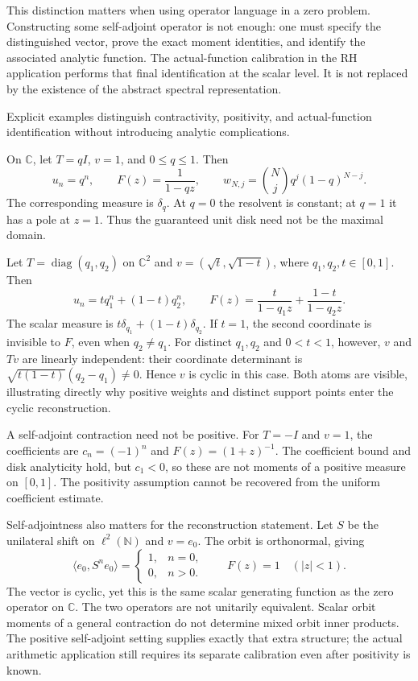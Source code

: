 This distinction matters when using operator language in a zero
problem. Constructing some self-adjoint operator is not enough:
one must specify the distinguished vector, prove the exact
moment identities, and identify the associated analytic function.
The actual-function calibration in the RH application performs
that final identification at the scalar level. It is not
replaced by the existence of the abstract spectral representation.

\label{hilb:examples}
Explicit examples distinguish contractivity, positivity, and
actual-function identification without introducing analytic
complications.

\begin{example}
On $\mathbb C$, let $T=qI$, $v=1$, and $0\le q\le1$. Then
\[
 u_n=q^n,\qquad F(z)=\frac1{1-qz},\qquad
 w_{N,j}=\binom Nj q^j(1-q)^{N-j}.
\]
The corresponding measure is $\delta_q$. At $q=0$ the
resolvent is constant; at $q=1$ it has a pole at $z=1$.
Thus the guaranteed unit disk need not be the maximal domain.
\end{example}

\begin{example}
Let $T=\operatorname{diag}(q_1,q_2)$ on $\mathbb C^2$ and
$v=(\sqrt t,\sqrt{1-t})$, where $q_1,q_2,t\in[0,1]$.
Then
\[
 u_n=tq_1^n+(1-t)q_2^n,\qquad
 F(z)=\frac{t}{1-q_1z}+\frac{1-t}{1-q_2z}.
\]
The scalar measure is $t\delta_{q_1}+(1-t)\delta_{q_2}$.
If $t=1$, the second coordinate is invisible to $F$, even
when $q_2\ne q_1$.
For distinct $q_1,q_2$ and $0<t<1$, however, $v$ and $Tv$
are linearly independent: their coordinate determinant is
$\sqrt{t(1-t)}(q_2-q_1)\ne0$. Hence $v$ is cyclic in this
case. Both atoms are visible, illustrating directly why positive
weights and distinct support points enter the cyclic reconstruction.
\end{example}

A self-adjoint contraction need not be positive. For $T=-I$
and $v=1$, the coefficients are $c_n=(-1)^n$ and
$F(z)=(1+z)^{-1}$. The coefficient bound and disk analyticity
hold, but $c_1<0$, so these are not moments of a positive
measure on $[0,1]$. The positivity assumption cannot be
recovered from the uniform coefficient estimate.

Self-adjointness also matters for the reconstruction statement.
Let $S$ be the unilateral shift on $\ell^2(\mathbb N)$ and
$v=e_0$. The orbit is orthonormal, giving
\[
 \langle e_0,S^ne_0\rangle=
 \begin{cases}1,&n=0,\\0,&n>0.\end{cases}
 \qquad F(z)=1\quad(|z|<1).
\]
The vector is cyclic, yet this is the same scalar generating
function as the zero operator on $\mathbb C$. The two
operators are not unitarily equivalent. Scalar orbit moments
of a general contraction do not determine mixed orbit inner
products. The positive self-adjoint setting supplies exactly
that extra structure; the actual arithmetic application still
requires its separate calibration even after positivity is known.
